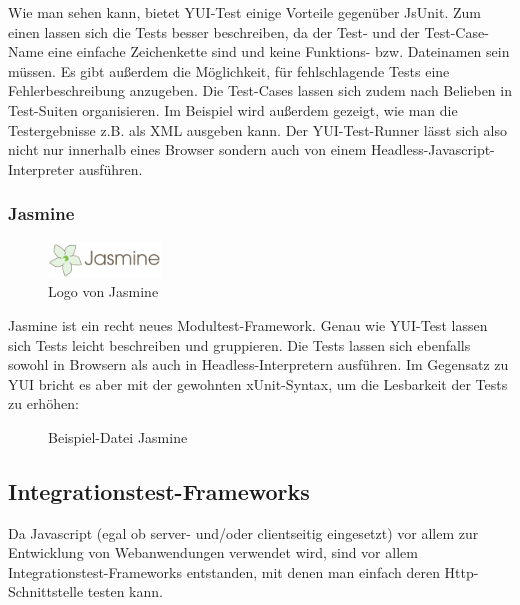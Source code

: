 Wie man sehen kann, bietet YUI-Test einige Vorteile gegenüber JsUnit. Zum einen lassen sich die Tests besser beschreiben, da der Test- und der Test-Case-Name eine einfache Zeichenkette sind und keine Funktions- bzw. Dateinamen sein müssen. Es gibt außerdem die Möglichkeit, für fehlschlagende Tests eine Fehlerbeschreibung anzugeben. Die Test-Cases lassen sich zudem nach Belieben in Test-Suiten organisieren. Im Beispiel wird außerdem gezeigt, wie man die Testergebnisse z.B. als XML ausgeben kann. Der YUI-Test-Runner lässt sich also nicht nur innerhalb eines Browser sondern auch von einem Headless-Javascript-Interpreter ausführen.

\subsubsection{Jasmine}

\begin{figure}[H]
	\begin{center}
		\includegraphics[width=3cm]{bilder/jasmine}
		\caption{Logo von Jasmine}
		\label{image:jasmine}
	\end{center}
\end{figure}

Jasmine ist ein recht neues Modultest-Framework. Genau wie YUI-Test lassen sich Tests leicht beschreiben und gruppieren. Die Tests lassen sich ebenfalls sowohl in Browsern als auch in Headless-Interpretern ausführen. Im Gegensatz zu YUI bricht es aber mit der gewohnten xUnit-Syntax, um die Lesbarkeit der Tests zu erhöhen:

\begin{figure}[H]
	\begin{center}
		\caption{Beispiel-Datei Jasmine}
		\label{code:jasmine}
	\end{center}
\end{figure}

\subsection{Integrationstest-Frameworks}

Da Javascript (egal ob server- und/oder clientseitig eingesetzt) vor allem zur Entwicklung von Webanwendungen verwendet wird, sind vor allem Integrationstest-Frameworks entstanden, mit denen man einfach deren Http-Schnittstelle testen kann.

